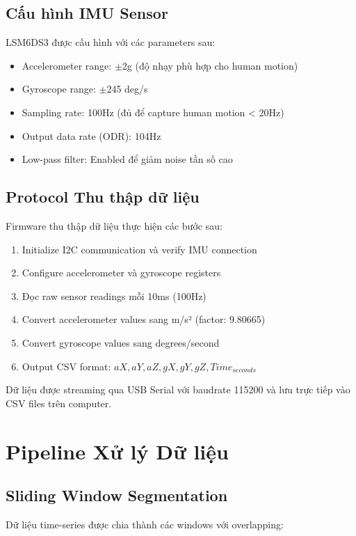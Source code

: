 \subsection{Cấu hình IMU Sensor}
LSM6DS3 được cấu hình với các parameters sau:
\begin{itemize}
    \item Accelerometer range: $\pm$2g (độ nhạy phù hợp cho human motion)
    \item Gyroscope range: $\pm$245 deg/s
    \item Sampling rate: 100Hz (đủ để capture human motion < 20Hz)
    \item Output data rate (ODR): 104Hz
    \item Low-pass filter: Enabled để giảm noise tần số cao
\end{itemize}

\subsection{Protocol Thu thập dữ liệu}
Firmware thu thập dữ liệu thực hiện các bước sau:

\begin{enumerate}
    \item Initialize I2C communication và verify IMU connection
    \item Configure accelerometer và gyroscope registers
    \item Đọc raw sensor readings mỗi 10ms (100Hz)
    \item Convert accelerometer values sang m/s² (factor: 9.80665)
    \item Convert gyroscope values sang degrees/second
    \item Output CSV format: $aX, aY, aZ, gX, gY, gZ, Time_{seconds}$
\end{enumerate}

Dữ liệu được streaming qua USB Serial với baudrate 115200 và lưu trực tiếp vào CSV files trên computer.

\section{Pipeline Xử lý Dữ liệu}
\label{sec:preprocessing-pipeline}

\subsection{Sliding Window Segmentation}
Dữ liệu time-series được chia thành các windows với overlapping:

